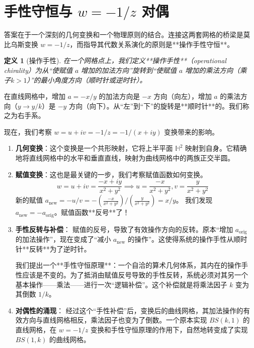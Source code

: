 \documentclass[a4paper,12pt]{book}
\numberwithin{problem}{section}
\newtheorem{definition}{定义}
\numberwithin{definition}{section}
\numberwithin{lemma}{section}
\numberwithin{proposition}{section}
\numberwithin{theorem}{section}
\numberwithin{grammar}{section}
\numberwithin{program}{section}
\numberwithin{convention}{section}
\numberwithin{corollary}{section}
\begin{document}
\section{手性守恒与 \texorpdfstring{$w=-1/z$}{w=-1/z} 对偶}
\label{sec:e1_chirality}

答案在于一个深刻的几何变换和一个物理原则的结合。连接这两套网格的桥梁是莫比乌斯变换 $w = -1/z$，而指导其代数关系演化的原则是**操作手性守恒**。

\begin{definition}[操作手性]
    \label{def:chirality}
    在一个网格点上，我们定义**操作手性**（operational chirality）为从“使赋值 $a$ 增加的加法方向”旋转到“使赋值 $a$ 增加的乘法方向（乘子$k>1$）”的最小角度方向（顺时针或逆时针）。
\end{definition}
在直线网格中，增加 $a=-x/y$ 的加法方向是 $-x$ 方向（向左），增加 $a$ 的乘法方向（$y \to y/k$）是 $-y$ 方向（向下）。从“左”到“下”的旋转是**顺时针**的。我们称之为右手系。

现在，我们考察 $w = u+iv = -1/z = -1/(x+iy)$ 变换带来的影响。
\begin{enumerate}
    \item \textbf{几何变换}：这个变换是一个共形映射，它将上半平面 $\mathbb{H}^2$ 映射到自身。它精确地将直线网格中的水平和垂直直线，映射为曲线网格中的两族正交半圆。
    \item \textbf{赋值变换}：这也是最关键的一步，我们考察赋值函数如何变换。
    \[ w = u+iv = \frac{-x+iy}{x^2+y^2} \implies u=\frac{-x}{x^2+y^2}, v=\frac{y}{x^2+y^2} \]
    新的赋值 $a_{\text{new}} = -u/v = -(\frac{-x}{x^2+y^2}) / (\frac{y}{x^2+y^2}) = x/y$。
    我们发现 $a_{\text{new}} = -a_{\text{orig}}$。赋值函数**反号**了！
    \item \textbf{手性反转与补偿}：
    赋值的反号，导致了有效操作方向的反转。原本“增加 $a_{\text{orig}}$ 的加法操作”，现在变成了“减小 $a_{\text{new}}$ 的操作”。这使得系统的操作手性从顺时针**反转**为了逆时针。

    我们提出一个**手性守恒原理**：一个自洽的算术几何体系，其内在的操作手性应该是不变的。为了抵消由赋值反号导致的手性反转，系统必须对其另一个基本操作——乘法——进行一次“逻辑补偿”。这个补偿就是将乘法因子 $k$ 变为其倒数 $1/k$。

    \item \textbf{对偶性的涌现}：
    经过这个“手性补偿”后，变换后的曲线网格，其加法操作的有效方向与直线网格相反，乘法因子也变为了倒数。一个原本实现 $BS(k,1)$ 的直线网格，在 $w=-1/z$ 变换和手性守恒原理的作用下，自然地转变成了实现 $BS(1,k)$ 的曲线网格。
\end{enumerate}
\end{document}
